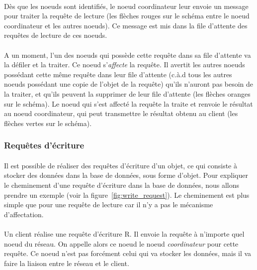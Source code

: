 \documentclass[12pt]{article}
\begin{document}
\paragraph{} Dès que les noeuds sont identifiés, le noeud coordinateur leur envoie un message pour traiter la requête de lecture (les flèches rouges sur le schéma entre le noeud coordinateur et les autres noeuds). Ce message est mis dans la file d'attente des requêtes de lecture de ces noeuds.

\paragraph{} A un moment, l'un des noeuds qui possède cette requête dans sa file d'attente va la défiler et la traiter. Ce noeud s'\textit{affecte} la requête. Il avertit les autres noeuds possédant cette même requête dans leur file d'attente (c.à.d tous les autres noeuds possédant une copie de l'objet de la requête) qu'ils n'auront pas besoin de la traiter, et qu'ils peuvent la supprimer de leur file d'attente (les flèches oranges sur le schéma). Le noeud qui s'est affecté la requête la traite et renvoie le résultat au noeud coordinateur, qui peut transmettre le résultat obtenu au client (les flèches vertes sur le schéma).

\subsubsection{Requêtes d'écriture}

\paragraph{} Il est possible de réaliser des requêtes d'écriture d'un objet, ce qui consiste à stocker des données dans la base de données, sous forme d'objet.  Pour expliquer le cheminement d'une requête d'écriture dans la base de données, nous allons prendre un exemple (voir la figure~\ref{fig:write_request}). Le cheminement est plus simple que pour une requête de lecture car il n'y a pas le mécanisme d'affectation.

\paragraph{} Un client réalise une requête d'écriture R. Il envoie la requête à n'importe quel noeud du réseau. On appelle alors ce noeud le noeud \textit{coordinateur} pour cette requête. Ce noeud n'est pas forcément celui qui va stocker les données, mais il va faire la liaison entre le réseau et le client.
\end{document}
